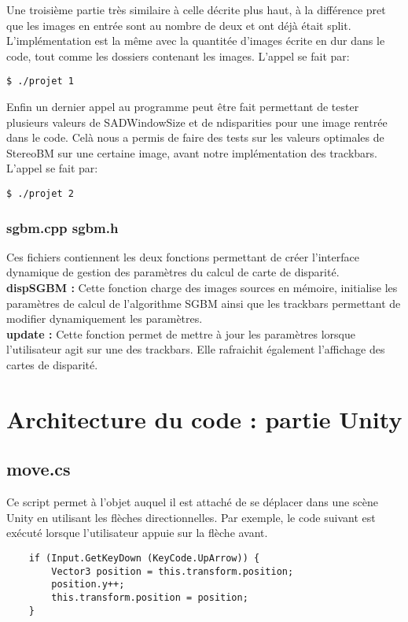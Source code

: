\documentclass[a4paper]{article}
\begin{document}
Une troisième partie très similaire à celle décrite plus haut, à la différence pret que les images en entrée sont au nombre de deux et ont déjà était split. L'implémentation est la même avec la quantitée d'images écrite en dur dans le code, tout comme les dossiers contenant les images. L'appel se fait par:
\begin{verbatim}
$ ./projet 1
\end{verbatim}

Enfin un dernier appel au programme peut être fait permettant de tester plusieurs valeurs de SADWindowSize et de ndisparities pour une image rentrée dans le code. Celà nous a permis de faire des tests sur les valeurs optimales de StereoBM sur une certaine image, avant notre implémentation des trackbars. L'appel se fait par:
\begin{verbatim}
$ ./projet 2
\end{verbatim}

\subsubsection*{sgbm.cpp sgbm.h}

Ces fichiers contiennent les deux fonctions permettant de créer l'interface dynamique
de gestion des paramètres du calcul de carte de disparité. \\
\textbf{dispSGBM :} Cette fonction charge des images sources en mémoire, initialise
les paramètres de calcul de l'algorithme SGBM ainsi que les trackbars permettant de
modifier dynamiquement les paramètres. \\
\textbf{update :} Cette fonction permet de mettre à jour les paramètres lorsque
l'utilisateur agit sur une des trackbars. Elle rafraichit également l'affichage des
cartes de disparité.


\section{Architecture du code : partie Unity}

\subsection*{move.cs}

Ce script permet à l'objet auquel il est attaché de se déplacer dans une scène
Unity en utilisant les flèches directionnelles. Par exemple, le code suivant est
exécuté lorsque l'utilisateur appuie sur la flèche avant.
\begin{verbatim}
	if (Input.GetKeyDown (KeyCode.UpArrow)) {
		Vector3 position = this.transform.position;
		position.y++;
		this.transform.position = position;
	}
\end{verbatim}
\end{document}
